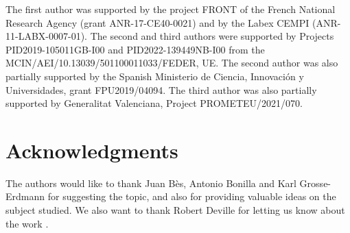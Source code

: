 \documentclass[openright,11pt]{article}
\theoremstyle{plain}
\theoremstyle{definition}
\begin{document}
The first author was supported by the project FRONT of the French National Research Agency (grant ANR-17-CE40-0021) and by the Labex CEMPI (ANR-11-LABX-0007-01). The second and third authors were supported by Projects PID2019-105011GB-I00 and PID2022-139449NB-I00 from the MCIN/AEI/10.13039/501100011033/FEDER, UE. The second author was also partially supported by the Spanish Ministerio de Ciencia, Innovaci\'on y Universidades, grant FPU2019/04094. The third author was also partially supported by Generalitat Valenciana, Project PROMETEU/2021/070.



\section*{Acknowledgments}

The authors would like to thank Juan B\`es, Antonio Bonilla and Karl Grosse-Erdmann for suggesting the topic, and also for providing valuable ideas on the subject studied. We also want to thank Robert Deville for letting us know about the work \cite{Auge2012}.
\end{document}
